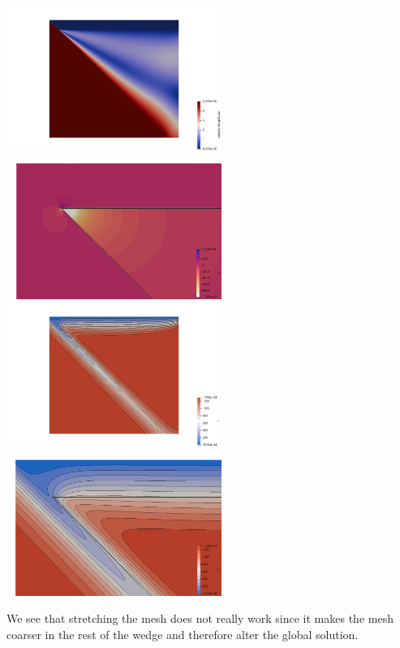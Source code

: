 \begin{center}
\includegraphics[width=7cm]{python_codes/fieldstone_68/results/case1c/vel}
\includegraphics[width=7cm]{python_codes/fieldstone_68/results/case1c/p}\\
\includegraphics[width=7cm]{python_codes/fieldstone_68/results/case1c/T}
\includegraphics[width=7cm]{python_codes/fieldstone_68/results/case1c/T_zoom}
\end{center}

We see that stretching the mesh does not really work since it makes the mesh coarser in the rest of the wedge and therefore 
alter the global solution.

